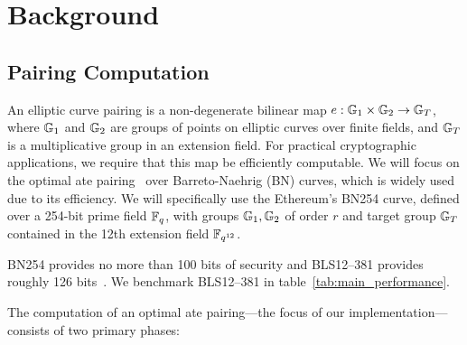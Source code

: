 \section{Background}

\begin{algorithm}
\caption{Optimal Ate pairing over Barreto-Naehrig curves~\cite{hsp10}}
\begin{algorithmic}[1]
    \EndIf
    \EndIf
\EndFor
{}
\end{algorithmic}
\end{algorithm}

\subsection{Pairing Computation}

An elliptic curve pairing is a non-degenerate bilinear map $e: \mathbb{G}_1 \times \mathbb{G}_2 \rightarrow \mathbb{G}_T$, where $\mathbb{G}_1$ and $\mathbb{G}_2$ are groups of points on elliptic curves over finite fields, and $\mathbb{G}_T$ is a multiplicative group in an extension field. For practical cryptographic applications, we require that this map be efficiently computable. We will focus on the optimal ate pairing~\cite{hsp10} over Barreto-Naehrig (BN) curves, which is widely used due to its efficiency.
We will specifically use the Ethereum's BN254 curve, defined over a 254-bit prime field $\mathbb{F}_q$, with groups $\mathbb{G}_1, \mathbb{G}_2$ of order $r$ and target group $\mathbb{G}_T$ contained in the 12th extension field $\mathbb{F}_{q^{12}}$.

BN254 provides no more than 100 bits of security and BLS12--381 provides roughly 126 bits~\cite{BarDuq19,pfc}. We benchmark BLS12--381 in table~\ref{tab:main_performance}.

The computation of an optimal ate pairing---the focus of our implementation---consists of two primary phases:

